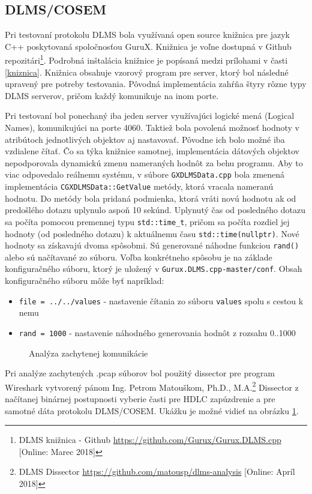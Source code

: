 \subsection{DLMS/COSEM}
\tab Pri testovaní protokolu DLMS bola využívaná open source knižnica pre jazyk C++ poskytovaná spoločnosťou GuruX. Knižnica je voľne dostupná v Github repozitári\footnote{DLMS knižnica - Github \url{https://github.com/Gurux/Gurux.DLMS.cpp} [Online: Marec 2018]}. Podrobná inštalácia knižnice je popísaná medzi prílohami v časti \ref{kniznica}. Knižnica obsahuje vzorový program pre server, ktorý bol následné upravený pre potreby testovania. Pôvodná implementácia zahŕňa štyry rôzne typy DLMS serverov, pričom každý komunikuje na inom porte. \par
Pri testovaní bol ponechaný iba jeden server využívajúci logické mená (Logical Names), komunikujúci na porte 4060. Taktiež bola povolená možnosť hodnoty v atribútoch jednotlivých objektov aj nastavovať. Pôvodne ich bolo možné iba vzdialene čítať. Čo sa týka knižnice samotnej, implementácia dátových objektov nepodporovala dynamickú zmenu nameraných hodnôt za behu programu. Aby to viac odpovedalo reálnemu systému, v súbore {\tt GXDLMSData.cpp} bola zmenená implementácia {\tt CGXDLMSData::GetValue} metódy, ktorá vracala nameranú hodnotu. Do metódy bola pridaná podmienka, ktorá vráti novú hodnotu ak od predošlého dotazu uplynulo aspoň 10 sekúnd. Uplynutý čas od posledného dotazu sa počíta pomocou premennej typu {\tt std::time\_t}, pričom sa počíta rozdiel jej hodnoty (od posledného dotazu) k aktuálnemu času {\tt std::time(nullptr)}. Nové hodnoty sa získavajú dvoma spôsobmi. Sú generované náhodne funkciou {\tt rand()} alebo sú načítavané zo súboru. Voľba konkrétneho spôsobu je na základe konfiguračného súboru, ktorý je uložený v {\tt Gurux.DLMS.cpp-master/conf}. Obsah konfiguračného súboru môže byť napríklad:
\begin{itemize}
\item {\tt file = ../../values} - nastavenie čítania zo súboru {\tt values} spolu s cestou k nemu
\item {\tt rand = 1000} - nastavenie náhodného generovania hodnôt z rozsahu 0..1000
\end{itemize} \par
\begin{figure}[h]
    \centering
    \caption{Analýza zachytenej komunikácie}
    \label{dissector}
\end{figure}
Pri analýze zachytených .pcap súborov bol použitý dissector pre program Wireshark vytvorený pánom Ing. Petrom Matouškom, Ph.D., M.A.\footnote{DLMS Dissector \url{https://github.com/matousp/dlms-analysis} [Online: Apríl 2018]} Dissector z načítanej binárnej postupnosti vyberie časti pre HDLC zapúzdrenie a pre samotné dáta protokolu DLMS/COSEM. Ukážku je možné vidieť na obrázku \ref{dissector}.
